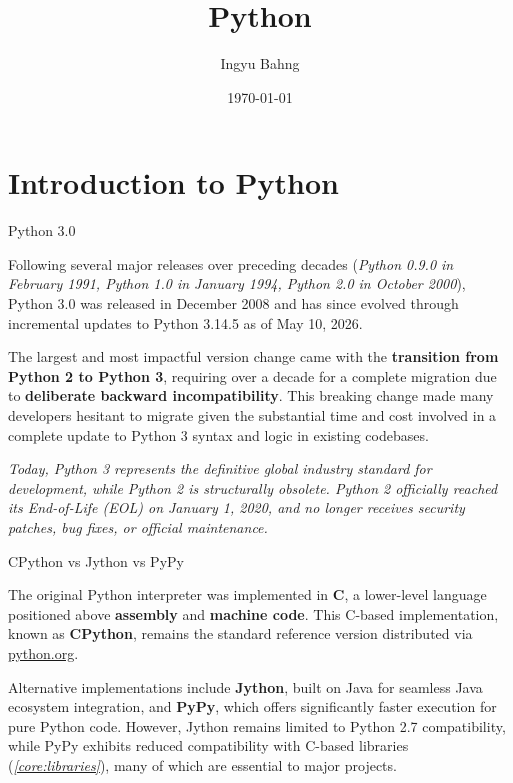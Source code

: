 \documentclass[10pt]{article}
\title{Python}
\date{\today}
\author{Ingyu Bahng}
\begin{document}


\section{Introduction to Python}
 
  \begin{core}{Python 3.0}

    Following several major releases over preceding decades (\textit{Python 0.9.0 in February 1991, Python 1.0 in January 1994, Python 2.0 in October 2000}), Python 3.0 was released in December 2008 and has since evolved through incremental updates to Python 3.14.5 as of May 10, 2026.

    The largest and most impactful version change came with the \textbf{transition from Python 2 to Python 3}, requiring over a decade for a complete migration due to \textbf{deliberate backward incompatibility}. This breaking change made many developers hesitant to migrate given the substantial time and cost involved in a complete update to Python 3 syntax and logic in existing codebases.

    \textit{Today, Python 3 represents the definitive global industry standard for development, while Python 2 is structurally obsolete. Python 2 officially reached its End-of-Life (EOL) on January 1, 2020, and no longer receives security patches, bug fixes, or official maintenance.}

  \end{core}

  \begin{core}[label=core:cpython]{CPython vs Jython vs PyPy}

    The original Python interpreter was implemented in \textbf{C}, a lower-level language positioned above \textbf{assembly} and \textbf{machine code}. This C-based implementation, known as \textbf{CPython}, remains the standard reference version distributed via \href{https://www.python.org/}{python.org}.

    Alternative implementations include \textbf{Jython}, built on Java for seamless Java ecosystem integration, and \textbf{PyPy}, which offers significantly faster execution for pure Python code. However, Jython remains limited to Python 2.7 compatibility, while PyPy exhibits reduced compatibility with C-based libraries (\textit{\autoref{core:libraries}}), many of which are essential to major projects.

  \end{core}
\end{document}
